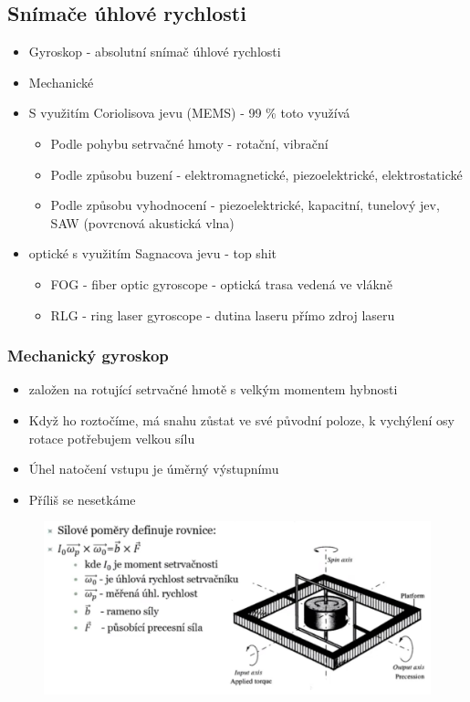 \subsection*{Snímače úhlové rychlosti}
\begin{itemize}
    \item Gyroskop - absolutní snímač úhlové rychlosti
    \item Mechanické 
    \item S využitím Coriolisova jevu (MEMS) - 99 \% toto využívá \begin{itemize}
        \item Podle pohybu setrvačné hmoty - rotační, vibrační
        \item Podle způsobu buzení - elektromagnetické, piezoelektrické, elektrostatické
        \item Podle způsobu vyhodnocení - piezoelektrické, kapacitní, tunelový jev, SAW (povrcnová akustická vlna)
    \end{itemize}
    \item optické s využitím Sagnacova jevu - top shit \begin{itemize}
        \item FOG - fiber optic gyroscope - optická trasa vedená ve vlákně 
        \item RLG - ring laser gyroscope - dutina laseru přímo zdroj laseru
    \end{itemize}
\end{itemize}

\subsubsection*{Mechanický gyroskop}
\begin{itemize}
    \item založen na rotující setrvačné hmotě s velkým momentem hybnosti
    \item Když ho roztočíme, má snahu zůstat ve své původní poloze, k vychýlení osy rotace potřebujem velkou sílu
    \item Úhel natočení vstupu je úměrný výstupnímu
    \item Příliš se nesetkáme
\end{itemize}

\begin{figure}[h]
    \centering
    \includegraphics[scale = 0.50]{img/TyPicoMeTakBaviVypracovavatSnimace.png}
\end{figure}

